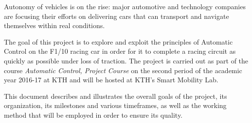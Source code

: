 Autonomy of vehicles is on the rise: major automotive and technology companies
are focusing their efforts on delivering cars that can transport and navigate
themselves within real conditions.

The goal of this project is to explore and exploit the principles of Automatic
Control on the F1/10 racing car in order for it to complete a racing circuit as
quickly as possible under loss of traction. The project is carried out as part
of the course \textit{Automatic Control, Project Course} on the second period
of the academic year 2016-17 at KTH and will be hosted at KTH's Smart Mobility
Lab.

This document describes and illustrates the overall goals of the project, its
organization, its milestones and various timeframes, as well as the working
method that will be employed in order to ensure its quality.
